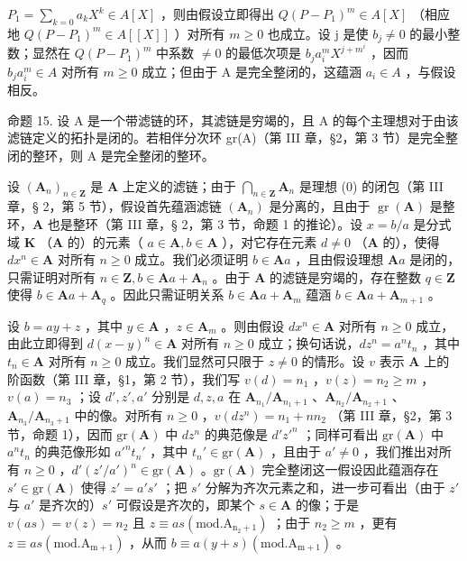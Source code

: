 \(P_{1}=\sum_{k=0}a_{k}X^{k}\in A[X]\) ，则由假设立即得出 \(Q(P-P_{1})^{m}\in A[X]\) （相应地 \(Q(P-P_{1})^{m}\in A[[X]]\) ）对所有 \(m\geqslant0\) 也成立。设 j 是使 \(b_{j}\neq0\) 的最小整数；显然在 \(Q(P-P_{1})^{m}\) 中系数 \(\neq0\) 的最低次项是 \(b_{j}a_{i}^{m}X^{j+m^{i}}\) ，因而 \(b_{j}a_{i}^{m}\in A\) 对所有 \(m\geqslant0\) 成立；但由于 A 是完全整闭的，这蕴涵 \(a_{i}\in A\) ，与假设相反。

命题 15. 设 A 是一个带滤链的环，其滤链是穷竭的，且 A 的每个主理想对于由该滤链定义的拓扑是闭的。若相伴分次环 gr(A)（第 III 章，§2，第 3 节）是完全整闭的整环，则 A 是完全整闭的整环。

设 \((\mathbf{A}_n)_{n\in \mathbf{Z}}\) 是 \(\mathbf{A}\) 上定义的滤链；由于 \(\bigcap_{n\in \mathbf{Z}}\mathbf{A}_n\) 是理想 (0) 的闭包（第 III 章，§ 2，第 5 节），假设首先蕴涵滤链 \((\mathbf{A}_n)\) 是分离的，且由于 \(\operatorname{gr}(\mathbf{A})\) 是整环，\(\mathbf{A}\) 也是整环（第 III 章，§ 2，第 3 节，命题 1 的推论）。设 \(x = b / a\) 是分式域 \(\mathbf{K}\) （\(\mathbf{A}\) 的）的元素（ \(a\in \mathbf{A}, b\in \mathbf{A}\) ），对它存在元素 \(d\neq 0\) （\(\mathbf{A}\) 的），使得 \(dx^n\in \mathbf{A}\) 对所有 \(n\geqslant 0\) 成立。我们必须证明 \(b\in \mathbf{A}a\) ，且由假设理想 \(\mathbf{A}a\) 是闭的，只需证明对所有 \(n\in \mathbf{Z}, b\in \mathbf{A}a + \mathbf{A}_n\) 。由于 \(\mathbf{A}\) 的滤链是穷竭的，存在整数 \(q\in \mathbf{Z}\) 使得 \(b\in \mathbf{A}a + \mathbf{A}_q\) 。因此只需证明关系 \(b\in \mathbf{A}a + \mathbf{A}_m\) 蕴涵 \(b\in \mathbf{A}a + \mathbf{A}_{m + 1}\) 。

设 \(b = ay + z\) ，其中 \(y \in \mathbf{A}\) ，\(z \in \mathbf{A}_m\) 。则由假设 \(dx^n \in \mathbf{A}\) 对所有 \(n \geqslant 0\) 成立，由此立即得到 \(d(x - y)^n \in \mathbf{A}\) 对所有 \(n \geqslant 0\) 成立；换句话说，\(dz^n = a^n t_n\) ，其中 \(t_n \in \mathbf{A}\) 对所有 \(n \geqslant 0\) 成立。我们显然可只限于 \(z \neq 0\) 的情形。设 \(v\) 表示 \(\mathbf{A}\) 上的阶函数（第 III 章，§1，第 2 节），我们写 \(v(d) = n_1\) ，\(v(z) = n_2 \geqslant m\) ，\(v(a) = n_3\) ；设 \(d', z', a'\) 分别是 \(d, z, a\) 在 \(\mathbf{A}_{n_1}/\mathbf{A}_{n_1+1}\) 、\(\mathbf{A}_{n_2}/\mathbf{A}_{n_2+1}\) 、\(\mathbf{A}_{n_3}/\mathbf{A}_{n_3+1}\) 中的像。对所有 \(n \geqslant 0\) ，\(v(dz^n) = n_1 + nn_2\) （第 III 章，§2，第 3 节，命题 1），因而 \(\mathrm{gr}(\mathbf{A})\) 中 \(dz^n\) 的典范像是 \(d'z'^n\) ；同样可看出 \(\mathrm{gr}(\mathbf{A})\) 中 \(a^n t_n\) 的典范像形如 \(a'^n t_n'\) ，其中 \(t_n' \in \mathrm{gr}(\mathbf{A})\) ，且由于 \(a' \neq 0\) ，我们推出对所有 \(n \geqslant 0\) ，\(d'(z'/a')^n \in \mathrm{gr}(\mathbf{A})\) 。\(\mathrm{gr}(\mathbf{A})\) 完全整闭这一假设因此蕴涵存在 \(s' \in \mathrm{gr}(\mathbf{A})\) 使得 \(z' = a's'\) ；把 \(s'\) 分解为齐次元素之和，进一步可看出（由于 \(z'\) 与 \(a'\) 是齐次的）\(s'\) 可假设是齐次的，即某个 \(s \in \mathbf{A}\) 的像；于是 \(v(as) = v(z) = n_2\) 且 \(z \equiv as (\mathrm{mod. A_{n_2+1}})\) ；由于 \(n_2 \geqslant m\) ，更有 \(z \equiv as (\mathrm{mod. A_{m+1}})\) ，从而 \(b \equiv a(y + s) (\mathrm{mod. A_{m+1}})\) 。
\relax{}
